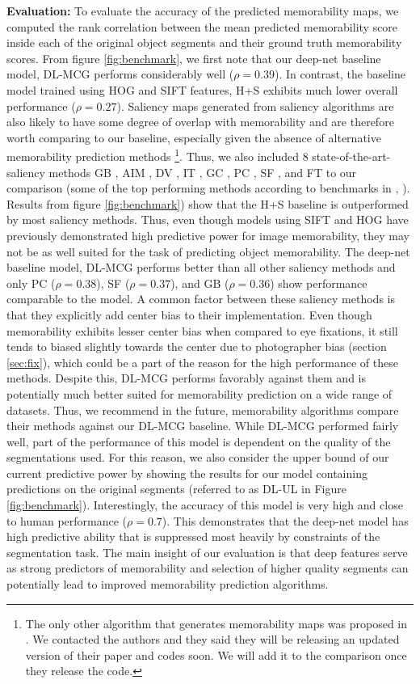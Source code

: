 \textbf{Evaluation: } To evaluate the accuracy of the predicted memorability maps, we computed the rank correlation between the mean predicted memorability score inside each of the original object segments and their ground truth memorability scores. From figure \ref{fig:benchmark}, we first note that our deep-net baseline model, DL-MCG performs considerably well ($\rho = 0.39$). In contrast, the baseline model trained using HOG and SIFT features, H+S exhibits much lower overall performance ($\rho = 0.27$). Saliency maps generated from saliency algorithms are also likely to have some degree of overlap with memorability and are therefore worth comparing to our baseline, especially given the absence of alternative memorability prediction methods \footnote{The only other algorithm that generates memorability maps was proposed in \cite{khosla12}. We contacted the authors and they said they will be releasing an updated version of their paper and codes soon. We will add it to the comparison once they release the code.}. Thus, we also included $8$ state-of-the-art-saliency methods GB \cite{gb}, AIM \cite{aim}, DV \cite{dv}, IT \cite{it}, GC \cite{gc}, PC \cite{pc}, SF \cite{sf}, and FT \cite{ft} to our comparison (some of the top performing methods according to benchmarks in \cite{borji13}, \cite{borji12}).  Results from figure \ref{fig:benchmark}) show that the H+S baseline is outperformed by most saliency methods. Thus, even though models using SIFT and HOG have previously demonstrated high predictive power for image memorability, they may not be as well suited for the task of predicting object memorability. The deep-net baseline model, DL-MCG performs better than all other saliency methods and only PC ($\rho=0.38$), SF ($\rho=0.37$), and GB ($\rho=0.36$) show performance comparable to the model. A common factor between these saliency methods is that they explicitly add center bias to their implementation. Even though memorability exhibits lesser center bias when compared to eye fixations, it still tends to biased slightly towards the center due to photographer bias (section \ref{sec:fix}), which could be a  part of the reason for the high performance of these methods. Despite this, DL-MCG performs favorably against them and is potentially much better suited for memorability prediction on a wide range of datasets. Thus, we recommend in the future, memorability algorithms compare their methods against our DL-MCG baseline. While DL-MCG performed fairly well, part of the performance of this model is dependent on the quality of the segmentations used. For this reason, we also consider the upper bound of our current predictive power by showing the results for our model containing predictions on the original segments (referred to as DL-UL in Figure \ref{fig:benchmark}). Interestingly, the accuracy of this model is very high and close to human performance ($\rho = 0.7$). This demonstrates that the deep-net model has high predictive ability that is suppressed most heavily by constraints of the segmentation task. The main insight of our evaluation is that deep features serve as strong predictors of memorability and selection of higher quality segments can potentially lead to improved memorability prediction algorithms.

